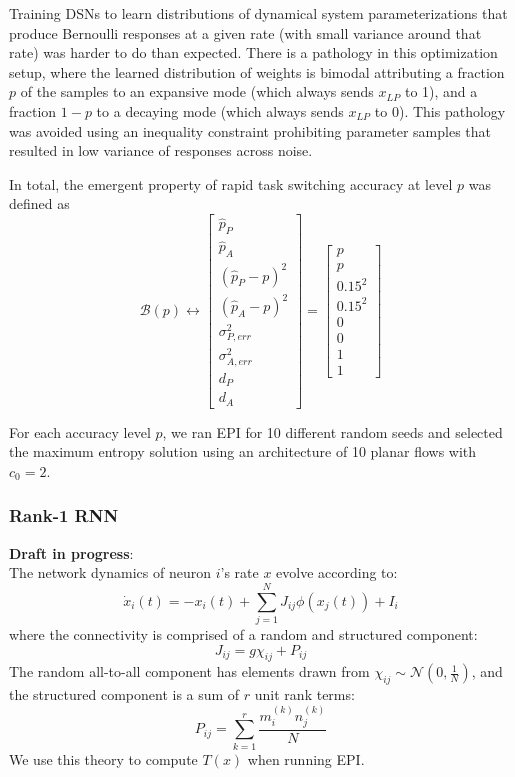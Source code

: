 \documentclass[11pt]{article}
\begin{document}
Training DSNs to learn distributions of dynamical system parameterizations that produce Bernoulli responses at a given rate (with small variance around that rate) was harder to do than expected.  There is a pathology in this optimization setup, where the learned distribution of weights is bimodal attributing a fraction $p$ of the samples to an expansive mode (which always sends $x_{LP}$ to 1), and a fraction $1-p$ to a decaying mode (which always sends $x_{LP}$ to 0).  This pathology was avoided using an inequality constraint prohibiting parameter samples that resulted in low variance of responses across noise.

In total, the emergent property of rapid task switching accuracy at level $p$ was defined as
\begin{equation}
\mathcal{B}(p) \leftrightarrow \begin{bmatrix} \hat{p}_P \\ \hat{p}_A \\ (\hat{p}_P-p)^2 \\ (\hat{p}_A - p)^2 \\ \sigma^2_{P,err} \\ \sigma^2_{A,err} \\ d_P \\ d_A \end{bmatrix} = \begin{bmatrix} p \\ p \\ 0.15^2 \\ 0.15^2 \\ 0 \\ 0 \\ 1 \\ 1 \end{bmatrix}
\end{equation}

For each accuracy level $p$, we ran EPI for 10 different random seeds and selected the maximum entropy solution using an architecture of 10 planar flows with $c_0 = 2$. 

\subsubsection{Rank-1 RNN}\label{methods_LRRNN}
\textbf{Draft in progress}: \\
The network dynamics of neuron $i$'s rate $x$ evolve according to:
\begin{equation}
\dot{x}_i(t) = -x_i(t) + \sum_{j=1}^N J_{ij} \phi(x_j(t)) + I_i 
\end{equation}
where the connectivity is comprised of a random and structured component:
\begin{equation}
J_{ij} = g \chi_{ij} + P_{ij}
\end{equation}
The random all-to-all component has elements drawn from
$\chi_{ij} \sim \mathcal{N}(0, \frac{1}{N})$, and the structured
component is a sum of $r$ unit rank terms:
\begin{equation}
P_{ij} = \sum_{k=1}^r \frac{m_i^{(k)}n_j^{(k)}}{N}
\end{equation}
We use this theory to compute $T(x)$ when running EPI.
\end{document}
